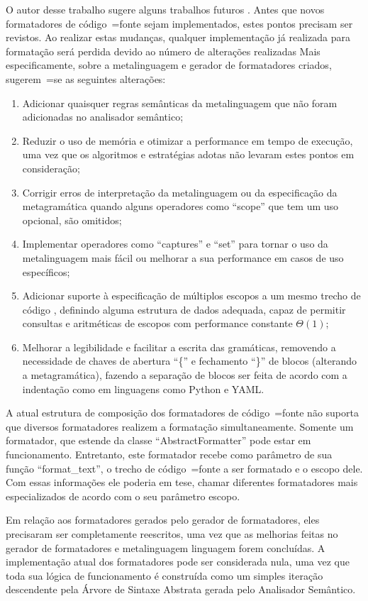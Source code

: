 O autor desse trabalho sugere alguns trabalhos futuros .
Antes que novos formatadores de código~=fonte sejam implementados,
estes pontos precisam ser revistos.
Ao realizar estas mudanças,
qualquer implementação já realizada para formatação será perdida devido ao número de alterações realizadas Mais especificamente,
sobre a metalinguagem e
gerador de formatadores criados,
sugerem~=se as seguintes alterações:
\begin{enumerate}
\item Adicionar quaisquer regras semânticas da metalinguagem que não foram adicionadas no analisador semântico;
\item Reduzir o uso de memória e
otimizar a performance em tempo de execução,
uma vez que os algoritmos e
estratégias adotas não levaram estes pontos em consideração;
\item Corrigir erros de interpretação da metalinguagem ou
da especificação da metagramática quando alguns operadores como ``scope'' que tem um uso opcional,
são omitidos;
\item Implementar operadores como ``captures'' e
``set'' para tornar o uso da metalinguagem mais fácil ou
melhorar a sua performance em casos de uso específicos;
\item Adicionar suporte à especificação de múltiplos escopos a um mesmo trecho de código \cite{vsCodeSyntaxHighlighthing},
definindo alguma estrutura de dados adequada,
capaz de permitir consultas e
aritméticas de escopos \cite{textMateScopeExclusion} com performance constante $\Theta(1)$;
\item Melhorar a legibilidade e
facilitar a escrita das gramáticas,
removendo a necessidade de chaves de abertura ``\{'' e
fechamento ``\}'' de blocos (alterando a metagramática),
fazendo a separação de blocos ser feita de acordo com a indentação como em linguagens como Python e
YAML.
\end{enumerate}%

A atual estrutura de composição dos formatadores de código~=fonte não suporta que diversos formatadores realizem a formatação simultaneamente.
Somente um formatador,
que estende da classe ``AbstractFormatter'' pode estar em funcionamento.
Entretanto,
este formatador recebe como parâmetro de sua função ``format\_text'',
o trecho de código~=fonte a ser formatado e
o escopo dele.
Com essas informações ele poderia em tese,
chamar diferentes formatadores mais especializados de acordo com o seu parâmetro escopo.

Em relação aos formatadores gerados pelo gerador de formatadores,
eles precisaram ser completamente reescritos,
uma vez que as melhorias feitas no gerador de formatadores e
metalinguagem linguagem forem concluídas.
A implementação atual dos formatadores pode ser considerada nula,
uma vez que toda sua lógica de funcionamento é construída como um simples iteração descendente pela Árvore de Sintaxe Abstrata gerada pelo Analisador Semântico.

